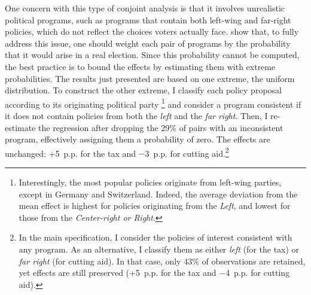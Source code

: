 \documentclass[12pt,english]{article}
\begin{document}
One concern with this type of conjoint analysis is that it involves unrealistic political programs, such as programs that contain both left-wing and far-right policies, which do not reflect the choices voters actually face. \cite{de_la_cuesta_improving_2022} show that, to fully address this issue, one should weight each pair of programs by the probability that it would arise in a real election. Since this probability cannot be computed, the best practice is to bound the effects by estimating them with extreme probabilities. The results just presented are based on one extreme, the uniform distribution. To construct the other extreme, I classify each policy proposal according to its originating political party%
\footnote{Interestingly, the most popular policies originate from left-wing parties, except in Germany and Switzerland. 
Indeed, the average deviation from the mean effect is highest for policies originating from the \textit{Left}, and lowest for those from the \textit{Center-right or Right}. 
} 
and consider a program consistent if it does not contain policies from both the \textit{left} and the \textit{far right}. Then, I re-estimate the regression after dropping the 29\% of pairs with an inconsistent program, effectively assigning them a probability of zero. The effects are unchanged: +5~p.p. for the tax and $-$3~p.p. for cutting aid.\footnote{In the main specification, I consider the policies of interest consistent with any program. As an alternative, I classify them as either \textit{left} (for the tax) or \textit{far right} (for cutting aid). In that case, only 43\% of observations are retained, yet effects are still preserved (+5~p.p. for the tax and $-$4~p.p. for cutting aid).} 
\end{document}
